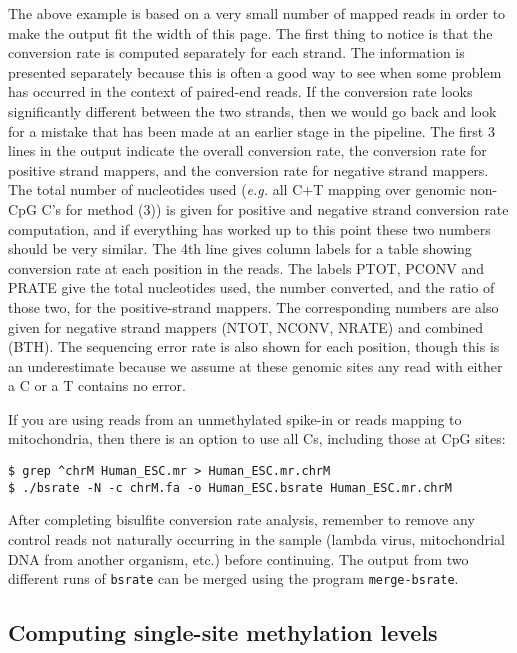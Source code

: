 \documentclass[10pt]{article}
\newcommand{\prog}[1]{\texttt{#1}}
\begin{document}
\noindent
The above example is based on a very small number of mapped reads in
order to make the output fit the width of this page.  The first thing
to notice is that the conversion rate is computed separately for each
strand. The information is presented separately because this is often
a good way to see when some problem has occurred in the context of
paired-end reads. If the conversion rate looks significantly different
between the two strands, then we would go back and look for a mistake
that has been made at an earlier stage in the pipeline. The first 3
lines in the output indicate the overall conversion rate, the
conversion rate for positive strand mappers, and the conversion rate
for negative strand mappers. The total number of nucleotides used
({\em e.g.} all C+T mapping over genomic non-CpG C's for method (3)) is
given for positive and negative strand conversion rate computation,
and if everything has worked up to this point these two numbers should
be very similar. The 4th line gives column labels for a table showing
conversion rate at each position in the reads.  The labels PTOT, PCONV
and PRATE give the total nucleotides used, the number converted, and
the ratio of those two, for the positive-strand mappers. The
corresponding numbers are also given for negative strand mappers
(NTOT, NCONV, NRATE) and combined (BTH). The sequencing error rate is
also shown for each position, though this is an underestimate because
we assume at these genomic sites any read with either a C or a T
contains no error.

If you are using reads from an unmethylated spike-in or reads mapping
to mitochondria, then there is an option to use all Cs, including those
at CpG sites:
\begin{verbatim}
$ grep ^chrM Human_ESC.mr > Human_ESC.mr.chrM
$ ./bsrate -N -c chrM.fa -o Human_ESC.bsrate Human_ESC.mr.chrM
\end{verbatim}

After completing bisulfite conversion rate analysis, remember to
remove any control reads not naturally occurring in the sample
(lambda virus, mitochondrial DNA from another organism, etc.)
before continuing. The output from two different runs of \prog{bsrate}
can be merged using the program \prog{merge-bsrate}.

\subsection{Computing single-site methylation levels}
\label{sec:estim-methyl-freq}
\end{document}
